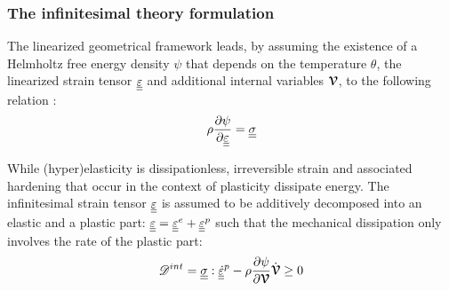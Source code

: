 \subsubsection*{The infinitesimal theory formulation}

The linearized geometrical framework leads, by assuming the existence of a Helmholtz free energy density $\psi$ that depends on the temperature $\theta$, the linearized strain tensor ${\underline{\underline{\varepsilon}}}$ and additional internal variables ${\boldsymbol{\mathcal{V}}}$, to the following relation \cite[Ch.4]{Foundation_of_elasticity}:
\begin{equation}
  \label{eq:Cauchy_definition}
  \rho \frac{\partial \psi}{\partial {\underline{\underline{\varepsilon}}}} = {\underline{\underline{\sigma}}}
\end{equation}


While (hyper)elasticity is dissipationless, irreversible strain and associated hardening that occur in the context of plasticity dissipate energy.
The infinitesimal strain tensor ${\underline{\underline{\varepsilon}}}$ is assumed to be additively decomposed into an elastic and a plastic part: ${\underline{\underline{\varepsilon}}} = {\underline{\underline{\varepsilon}}}^e + {\underline{\underline{\varepsilon}}}^p$ such that the mechanical dissipation only involves the rate of the plastic part:
\begin{equation}
  \label{eq:HPP_dissipation}
  \mathscr{D}^{int}={\underline{\underline{\sigma}}}:{\underline{\underline{\dot{\varepsilon}}}}^p -\rho \frac{\partial \psi}{\partial {\boldsymbol{\mathcal{V}}}}\dot{{\boldsymbol{\mathcal{V}}}} \geq 0
\end{equation}

